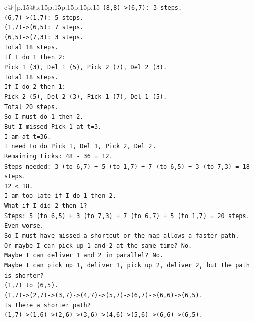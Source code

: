 \documentclass{article}
\begin{document}
{\begin{supertabular}{c@{$\;$}|p{.15\linewidth}@{}p{.15\linewidth}p{.15\linewidth}p{.15\linewidth}p{.15\linewidth}p{.15\linewidth}}
{{{\texttt{(8,8){-}>(6,7): 3 steps.} \\
\texttt{(6,7){-}>(1,7): 5 steps.} \\
\texttt{(1,7){-}>(6,5): 7 steps.} \\
\texttt{(6,5){-}>(7,3): 3 steps.} \\
\texttt{Total 18 steps.} \\
\texttt{If I do 1 then 2:} \\
\texttt{Pick 1 (3), Del 1 (5), Pick 2 (7), Del 2 (3).} \\
\texttt{Total 18 steps.} \\
\texttt{If I do 2 then 1:} \\
\texttt{Pick 2 (5), Del 2 (3), Pick 1 (7), Del 1 (5).} \\
\texttt{Total 20 steps.} \\
\texttt{So I must do 1 then 2.} \\
\texttt{But I missed Pick 1 at t=3.} \\
\texttt{I am at t=36.} \\
\texttt{I need to do Pick 1, Del 1, Pick 2, Del 2.} \\
\texttt{Remaining ticks: 48 {-} 36 = 12.} \\
\texttt{Steps needed: 3 (to 6,7) + 5 (to 1,7) + 7 (to 6,5) + 3 (to 7,3) = 18 steps.} \\
\texttt{12 < 18.} \\
\texttt{I am too late if I do 1 then 2.} \\
\texttt{What if I did 2 then 1?} \\
\texttt{Steps: 5 (to 6,5) + 3 (to 7,3) + 7 (to 6,7) + 5 (to 1,7) = 20 steps.} \\
\texttt{Even worse.} \\
\texttt{So I must have missed a shortcut or the map allows a faster path.} \\
\texttt{Or maybe I can pick up 1 and 2 at the same time? No.} \\
\texttt{Maybe I can deliver 1 and 2 in parallel? No.} \\
\texttt{Maybe I can pick up 1, deliver 1, pick up 2, deliver 2, but the path is shorter?} \\
\texttt{(1,7) to (6,5).} \\
\texttt{(1,7){-}>(2,7){-}>(3,7){-}>(4,7){-}>(5,7){-}>(6,7){-}>(6,6){-}>(6,5).} \\
\texttt{Is there a shorter path?} \\
\texttt{(1,7){-}>(1,6){-}>(2,6){-}>(3,6){-}>(4,6){-}>(5,6){-}>(6,6){-}>(6,5).} \\
}}}
\end{supertabular}}
\end{document}
